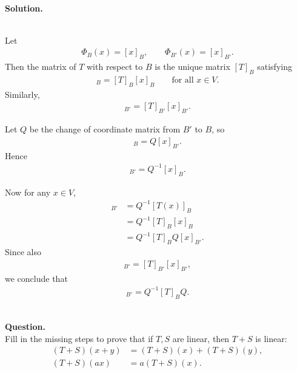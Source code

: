 \documentclass{article}
\begin{document}
\noindent\\
\textbf{Solution.}\\
\quad\\
\begin{mdframed}[linewidth=1pt]
Let
\begin{align*}
\Phi_B(x)=[x]_B,\qquad \Phi_{B'}(x)=[x]_{B'}.
\end{align*}
Then the matrix of $T$ with respect to $B$ is the unique matrix $[T]_B$ satisfying
\begin{align*}
[T(x)]_B=[T]_B[x]_B\qquad \text{for all }x\in V.
\end{align*}
Similarly,
\begin{align*}
[T(x)]_{B'}=[T]_{B'}[x]_{B'}.
\end{align*}

Let $Q$ be the change of coordinate matrix from $B'$ to $B$, so
\begin{align*}
[x]_B=Q[x]_{B'}.
\end{align*}
Hence
\begin{align*}
[x]_{B'}=Q^{-1}[x]_B.
\end{align*}

Now for any $x\in V$,
\begin{align*}
[T(x)]_{B'}
&=Q^{-1}[T(x)]_B \\
&=Q^{-1}[T]_B[x]_B \\
&=Q^{-1}[T]_BQ[x]_{B'}.
\end{align*}
Since also
\begin{align*}
[T(x)]_{B'}=[T]_{B'}[x]_{B'},
\end{align*}
we conclude that
\begin{align*}
[T]_{B'}=Q^{-1}[T]_BQ.
\end{align*}

\end{mdframed}

\bigskip

\hfill \break  $~\!\!$ \dotfill \medskip \\
\textbf{Question.}\\
Fill in the missing steps to prove that if $T,S$ are linear, then $T+S$ is linear:
\begin{align*}
(T+S)(x+y) &= (T+S)(x) + (T+S)(y), \\
(T+S)(ax) &= a(T+S)(x).
\end{align*}
\end{document}
